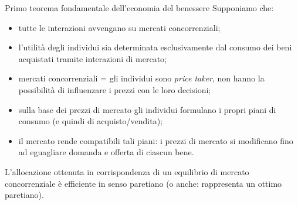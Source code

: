 \documentclass[aspectratio=64,12pt]{beamer}
\begin{document}
\begin{frame}{Primo teorema fondamentale dell’economia del benessere}
Supponiamo che:
\begin{itemize}
\item tutte le interazioni avvengano su mercati concorrenziali;
\item l’utilità degli individui sia determinata esclusivamente dal consumo dei beni
acquistati tramite interazioni di mercato;
\item mercati concorrenziali = gli individui sono \emph{price taker}, non hanno la
possibilità di influenzare i prezzi con le loro decisioni;
\item sulla base dei prezzi di mercato gli individui formulano i propri piani di
consumo (e quindi di acquisto/vendita);
\item il mercato rende compatibili tali piani: i prezzi di mercato si modificano
fino ad eguagliare domanda e offerta di ciascun bene.
\end{itemize}
\begin{block}{}
L’allocazione ottenuta in corrispondenza di un equilibrio di mercato concorrenziale è efficiente in senso paretiano (o anche: rappresenta un ottimo paretiano).
\end{block}
\end{frame}
\end{document}
